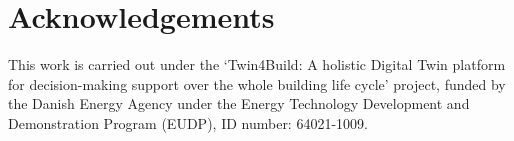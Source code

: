 \section*{Acknowledgements}


This work is carried out under the ‘Twin4Build: A holistic Digital Twin platform for decision-making support over the whole building life cycle’ project, funded by the Danish Energy Agency under the Energy Technology Development and Demonstration Program (EUDP), ID number: 64021-1009.
